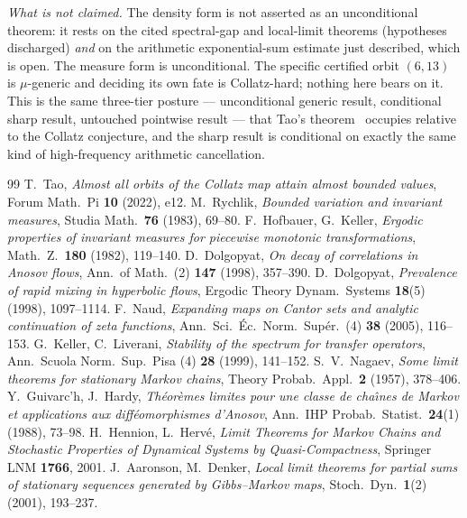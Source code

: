 \documentclass[11pt]{article}
\theoremstyle{definition}\newtheorem{definition}{Definition}
\theoremstyle{remark}\newtheorem{remark}{Remark}
\begin{document}
\emph{What is not claimed.} The density form is not asserted as an
unconditional theorem: it rests on the cited spectral-gap and local-limit
theorems (hypotheses discharged) \emph{and} on the arithmetic exponential-sum
estimate just described, which is open. The measure form is unconditional. The
specific certified orbit $(6,13)$ is $\mu$-generic and deciding its own fate is
Collatz-hard; nothing here bears on it. This is the same three-tier posture ---
unconditional generic result, conditional sharp result, untouched pointwise
result --- that Tao's theorem~\cite{Tao2022} occupies relative to the Collatz
conjecture, and the sharp result is conditional on exactly the same kind of
high-frequency arithmetic cancellation.

\begin{thebibliography}{99}
 T.\ Tao, \emph{Almost all orbits of the Collatz map attain almost bounded values}, Forum Math.\ Pi \textbf{10} (2022), e12.
 M.\ Rychlik, \emph{Bounded variation and invariant measures}, Studia Math.\ \textbf{76} (1983), 69--80.
 F.\ Hofbauer, G.\ Keller, \emph{Ergodic properties of invariant measures for piecewise monotonic transformations}, Math.\ Z.\ \textbf{180} (1982), 119--140.
 D.\ Dolgopyat, \emph{On decay of correlations in Anosov flows}, Ann.\ of Math.\ (2) \textbf{147} (1998), 357--390.
 D.\ Dolgopyat, \emph{Prevalence of rapid mixing in hyperbolic flows}, Ergodic Theory Dynam.\ Systems \textbf{18}(5) (1998), 1097--1114.
 F.\ Naud, \emph{Expanding maps on Cantor sets and analytic continuation of zeta functions}, Ann.\ Sci.\ \'Ec.\ Norm.\ Sup\'er.\ (4) \textbf{38} (2005), 116--153.
 G.\ Keller, C.\ Liverani, \emph{Stability of the spectrum for transfer operators}, Ann.\ Scuola Norm.\ Sup.\ Pisa (4) \textbf{28} (1999), 141--152.
 S.\ V.\ Nagaev, \emph{Some limit theorems for stationary Markov chains}, Theory Probab.\ Appl.\ \textbf{2} (1957), 378--406.
 Y.\ Guivarc'h, J.\ Hardy, \emph{Th\'eor\`emes limites pour une classe de cha\^\i nes de Markov et applications aux diff\'eomorphismes d'Anosov}, Ann.\ IHP Probab.\ Statist.\ \textbf{24}(1) (1988), 73--98.
 H.\ Hennion, L.\ Herv\'e, \emph{Limit Theorems for Markov Chains and Stochastic Properties of Dynamical Systems by Quasi-Compactness}, Springer LNM \textbf{1766}, 2001.
 J.\ Aaronson, M.\ Denker, \emph{Local limit theorems for partial sums of stationary sequences generated by Gibbs--Markov maps}, Stoch.\ Dyn.\ \textbf{1}(2) (2001), 193--237.
\end{thebibliography}
\end{document}
